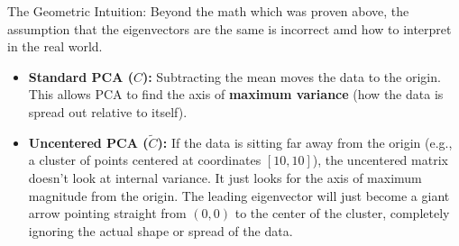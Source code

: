 \documentclass[twoside, 10pt]{article}
\begin{document}
The Geometric Intuition: Beyond the math which was proven above, the assumption that the eigenvectors are the same is incorrect amd how to interpret in the real world.
\begin{itemize}
    \item \textbf{Standard PCA ($C$):} Subtracting the mean moves the data to the origin. This allows PCA to find the axis of \textbf{maximum variance} (how the data is spread out relative to itself). 
    \item \textbf{Uncentered PCA ($\tilde{C}$):} If the data is sitting far away from the origin (e.g., a cluster of points centered at coordinates $[10, 10]$), the uncentered matrix doesn't look at internal variance. It just looks for the axis of maximum magnitude from the origin. The leading eigenvector will just become a giant arrow pointing straight from $(0,0)$ to the center of the cluster, completely ignoring the actual shape or spread of the data.
\end{itemize}
\end{document}
